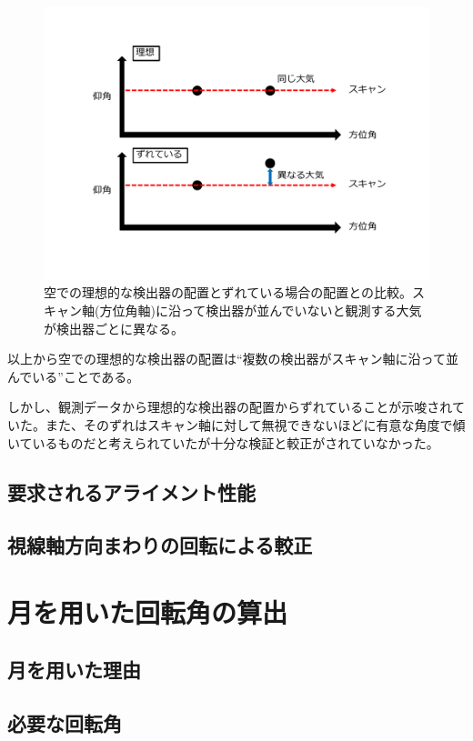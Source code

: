 \begin{figure}[htbp]
  \centering
  \includegraphics[width=0.7\columnwidth]{5_alignment/figs/scan_axis.pdf}
  \caption{空での理想的な検出器の配置とずれている場合の配置との比較。スキャン軸(方位角軸)に沿って検出器が並んでいないと観測する大気が検出器ごとに異なる。}
  \label{scan_axis}
\end{figure}

以上から空での理想的な検出器の配置は``複数の検出器がスキャン軸に沿って並んでいる''ことである。

しかし、観測データから理想的な検出器の配置からずれていることが示唆されていた。また、そのずれはスキャン軸に対して無視できないほどに有意な角度で傾いているものだと考えられていたが十分な検証と較正がされていなかった。

\subsection{要求されるアライメント性能}

\subsection{視線軸方向まわりの回転による較正}

\section{月を用いた回転角の算出}

\subsection{月を用いた理由}

\subsection{必要な回転角}

